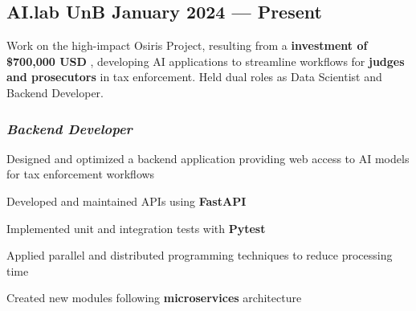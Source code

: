 \documentclass[a4paper,12pt]{article}
\begin{document}

\subsection*{\large AI.lab UnB \hfill January 2024 --- Present}


Work on the high-impact Osiris Project, resulting from a \textbf{investment of \$700,000 USD} , developing AI applications to streamline workflows for \textbf{judges and prosecutors} in tax enforcement. Held dual roles as Data Scientist and Backend Developer.

\vspace{0.5em}

\vspace{1em}

\subsubsection*{\small \textit{Backend Developer} }
\vspace{-1em}
\vspace{-0.5em}
\begin{zitemize}
    \item Designed and optimized a backend application providing web access to AI models for tax enforcement workflows
    \item Developed and maintained APIs using \textbf{FastAPI}
    \item Implemented unit and integration tests with \textbf{Pytest}
    \item Applied parallel and distributed programming techniques to reduce processing time
    \item Created new modules following \textbf{microservices} architecture
\end{zitemize}
\end{document}
